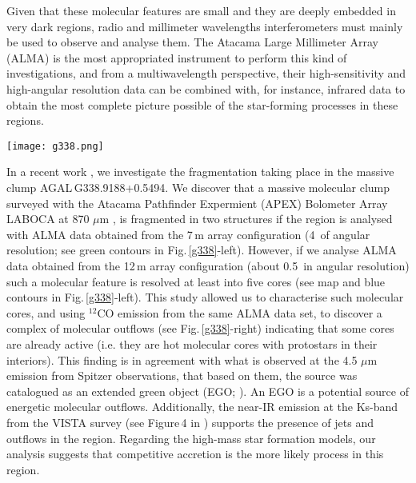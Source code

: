 \documentclass[baaa]{baaa}
\begin{document}
Given that these molecular features are small and they are deeply embedded in very dark regions, radio and millimeter wavelengths interferometers must mainly be used to observe and analyse them. The Atacama Large Millimeter Array (ALMA) is the most appropriated instrument to perform this kind of investigations, and from a multiwavelength perspective, their high-sensitivity and high-angular resolution data can be combined with, for instance, infrared data to obtain the most complete picture possible of the star-forming processes in these regions.

\begin{figure*}[h!]
\centering
\texttt{[image: g338.png]}
\caption{
Left: ALMA continuum emission at 340 GHz (12\,m array) in grayscale with blue contours. The
green contours correspond to the ALMA continuum emission at 340 GHz (7\,m array).
Right: Molecular outflows obtained from the integration of the spectral red and blue shifted wings in the $^{12}$CO J=3--2 line. Images extracted from \citet{ortega23}.
}
\label{g338}
\end{figure*}


In a recent work \citep{ortega23}, we investigate the fragmentation taking place in the massive
clump AGAL\,G338.9188+0.5494. We discover that a massive molecular clump surveyed with the Atacama Pathfinder Expermient (APEX) Bolometer Array LABOCA at 870 $\mu$m \citep{cseng14}, is fragmented in two structures if the region is analysed with ALMA data obtained from the 7\,m array configuration  (4\arcsec~of angular resolution; see green contours in Fig.\,\ref{g338}-left). However, if we analyse ALMA data obtained from the 12\,m array configuration (about 0.5\arcsec~in angular resolution) such a molecular feature is resolved at least into five cores (see map and blue contours in Fig.\,\ref{g338}-left). This study allowed us to characterise such molecular cores, and using $^{12}$CO emission from the same ALMA data set, to discover a complex of molecular outflows (see Fig.\,\ref{g338}-right) indicating that some cores are already active (i.e. they are hot molecular cores with protostars in their interiors). This finding is in agreement with what is observed at the 4.5 $\mu$m emission from Spitzer observations, that based on them, the source was catalogued as an extended green object (EGO; \citealt{cyga2008}). An EGO is a potential source of energetic molecular outflows. Additionally, the near-IR emission at the Ks-band from the VISTA survey (see Figure\,4 in \citealt{ortega23}) supports the presence of jets and outflows in the region. Regarding the high-mass star formation models, our analysis suggests that competitive accretion is the more likely process in this region. 
\end{document}
